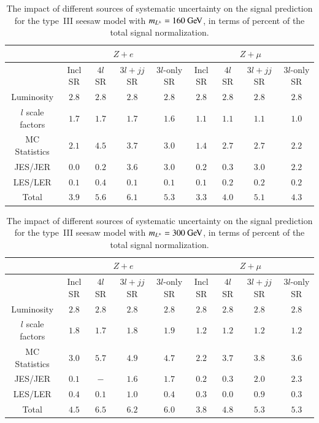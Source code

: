 \begin{table}[htbp]
  \centering
  \begin{tabular}{|c|c|c|c|c||c|c|c|c|}
    \hline
     & \multicolumn{4}{|c||}{$Z+e$} & \multicolumn{4}{c|}{$Z+\mu$} \\
    \hline
     &  Incl SR & $4l$ SR & $3l+jj$ SR  & $3l$-only SR  & Incl SR & $4l$ SR & $3l+jj$ SR  & $3l$-only SR  \\
    \hline
    Luminosity  & $2.8$ & $2.8$ & $2.8$ & $2.8$ & $2.8$ & $2.8$ & $2.8$ & $2.8$ \\
    $l$ scale factors & $1.7$ & $1.7$ & $1.7$ & $1.6$ & $1.1$ & $1.1$ & $1.1$ & $1.0$ \\
    MC Statistics & $2.1$ & $4.5$ & $3.7$ & $3.0$ & $1.4$ & $2.7$ & $2.7$ & $2.2$ \\
    JES/JER & $0.0$ & $0.2$ & $3.6$ & $3.0$ & $0.2$ & $0.3$ & $3.0$ & $2.2$ \\
    LES/LER & $0.1$ & $0.4$ & $0.1$ & $0.1$ & $0.1$ & $0.2$ & $0.2$ & $0.2$ \\
    \hline
    \hline
    Total & $3.9$ & $5.6$ & $6.1$ & $5.3$ & $3.3$ & $4.0$ & $5.1$ & $4.3$ \\
    \hline
  \end{tabular}
  \caption{The impact of different sources of systematic uncertainty on the signal prediction for the type~III seesaw model with $m_{\lpm}=160 \GeV$, in terms of percent of the total signal normalization.}
  \label{table:systematics-impact-summary-seesaw-160}
\end{table}

\begin{table}[htbp]
  \centering
  \begin{tabular}{|c|c|c|c|c||c|c|c|c|}
    \hline
     & \multicolumn{4}{|c||}{$Z+e$} & \multicolumn{4}{c|}{$Z+\mu$} \\
    \hline
     &  Incl SR & $4l$ SR & $3l+jj$ SR  & $3l$-only SR  & Incl SR & $4l$ SR & $3l+jj$ SR  & $3l$-only SR  \\
    \hline
    Luminosity  & $2.8$ & $2.8$ & $2.8$ & $2.8$ & $2.8$ & $2.8$ & $2.8$ & $2.8$ \\
    $l$ scale factors & $1.8$ & $1.7$ & $1.8$ & $1.9$ & $1.2$ & $1.2$ & $1.2$ & $1.2$ \\
    MC Statistics & $3.0$ & $5.7$ & $4.9$ & $4.7$ & $2.2$ & $3.7$ & $3.8$ & $3.6$ \\
    JES/JER & $0.1$ & $-$ & $1.6$ & $1.7$ & $0.2$ & $0.3$ & $2.0$ & $2.3$ \\
    LES/LER & $0.4$ & $0.1$ & $1.0$ & $0.4$ & $0.3$ & $0.0$ & $0.9$ & $0.3$ \\
    \hline
    \hline
    Total & $4.5$ & $6.5$ & $6.2$ & $6.0$ & $3.8$ & $4.8$ & $5.3$ & $5.3$ \\
    \hline
  \end{tabular}
  \caption{The impact of different sources of systematic uncertainty on the signal prediction for the type~III seesaw model with $m_{\lpm}=300 \GeV$, in terms of percent of the total signal normalization.}
  \label{table:systematics-impact-summary-seesaw-300}
\end{table}

